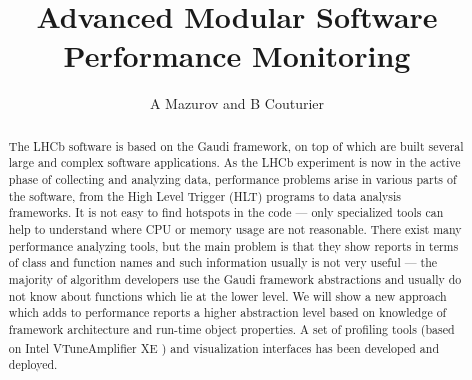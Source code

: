\documentclass[a4paper]{jpconf}
\begin{document}
\title{Advanced Modular Software Performance Monitoring }
\author{A Mazurov and B Couturier}
\thispagestyle{fancy}
\address{ CERN, European Organization for Nuclear Research, Geneva, Switzerland}
\address{ University of Ferrara, Ferrara, Italy}
\address{ Institute for Nuclear Research, Troitsk, Russia}




\newcommand\iamp{{Intel\textsuperscript{\textregistered} VTune\texttrademark Amplifier XE} }
\newcommand\amp{{VTune\texttrademark Amplifier XE} }
\newcommand\intel{{Intel\textsuperscript{\textregistered}} }
\newcommand\google{{Google\textsuperscript{\textregistered} }}

\begin{abstract}
The LHCb software is based on the Gaudi framework, on top of which are built several large and complex software 
applications. As the LHCb experiment is now in the active phase of collecting and analyzing data, performance problems 
arise in various parts of the software, from the High Level Trigger (HLT) programs to data analysis frameworks. 
It is not easy to find hotspots in the code --- only specialized tools can help to understand where CPU or memory usage 
are not reasonable. There exist many performance analyzing tools, but the main problem is that they show reports in 
terms of class and function names and such information usually is not very useful --- the majority of algorithm 
developers use the Gaudi framework abstractions and usually do not know about functions which lie at the lower level. 
We will show a new approach which adds to performance reports a higher abstraction level based on knowledge of 
framework architecture and run-time object properties. A set of profiling tools (based on \iamp) and visualization 
interfaces has been developed and deployed.
\end{abstract}
\end{document}

